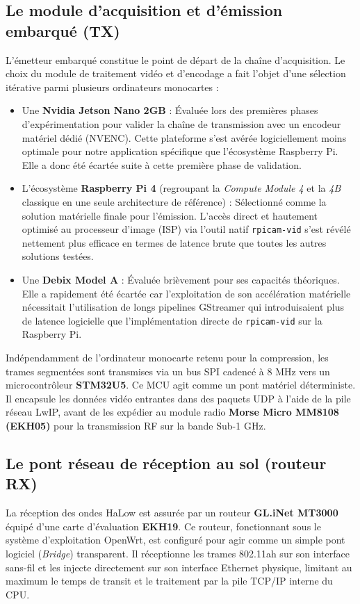 \subsection{Le module d'acquisition et d'émission embarqué (TX)}
L'émetteur embarqué constitue le point de départ de la chaîne d'acquisition. Le choix du module de traitement 
vidéo et d'encodage a fait l'objet d'une sélection itérative parmi plusieurs ordinateurs monocartes :
\begin{itemize}
    \item Une \textbf{Nvidia Jetson Nano 2GB} : Évaluée lors des premières phases d'expérimentation 
    pour valider la chaîne de transmission avec un encodeur matériel dédié (NVENC). Cette plateforme s'est 
    avérée logiciellement moins optimale pour notre application spécifique que l'écosystème Raspberry Pi. Elle a donc 
    été écartée suite à cette première phase de validation.
    \item L'écosystème \textbf{Raspberry Pi 4} (regroupant la \textit{Compute Module 4} et la 
    \textit{4B} classique en une seule architecture de référence) : Sélectionné comme la solution matérielle finale 
    pour l'émission. L'accès direct et hautement optimisé au processeur d'image (ISP) via l'outil natif \texttt{rpicam-vid} 
    s'est révélé nettement plus efficace en termes de latence brute que toutes les autres solutions testées.
    \item Une \textbf{Debix Model A} : Évaluée brièvement pour ses capacités théoriques. Elle a rapidement 
    été écartée car l'exploitation de son accélération matérielle nécessitait l'utilisation de longs pipelines GStreamer 
    qui introduisaient plus de latence logicielle que l'implémentation directe de \texttt{rpicam-vid} 
    sur la Raspberry Pi.
\end{itemize}

Indépendamment de l'ordinateur monocarte retenu pour la compression, les trames segmentées sont transmises 
via un bus SPI cadencé à 8 MHz vers un microcontrôleur \textbf{STM32U5}. Ce MCU agit comme un 
pont matériel déterministe. Il encapsule les données vidéo entrantes dans des paquets UDP à l'aide de la pile 
réseau LwIP, avant de les expédier au module radio \textbf{Morse Micro MM8108 (EKH05)} 
pour la transmission RF sur la bande Sub-1 GHz.

\subsection{Le pont réseau de réception au sol (routeur RX)}
La réception des ondes HaLow est assurée par un routeur \textbf{GL.iNet MT3000} équipé d'une carte 
d'évaluation \textbf{EKH19}. Ce routeur, fonctionnant sous le système d'exploitation 
OpenWrt, est configuré pour agir comme un simple pont logiciel (\textit{Bridge}) transparent. 
Il réceptionne les trames 802.11ah sur son interface sans-fil et les injecte directement sur son interface 
Ethernet physique, limitant au maximum le temps de transit et le traitement par la pile TCP/IP interne du CPU.

